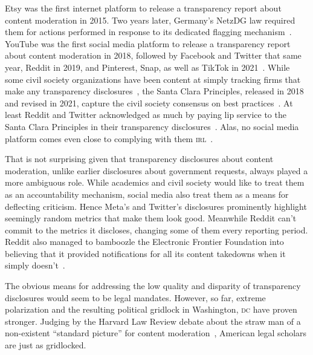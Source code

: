 \documentclass[nonacm,screen]{acmart}
\newcommand\V[1]{\textsc{\MakeLowercase{#1}}}
\begin{document}
Etsy was the first internet platform to release a transparency report about
content moderation in 2015. Two years later, Germany's NetzDG law required them
for actions performed in response to its dedicated flagging
mechanism~\cite{TrustSafetyProfessionalAssociation2022}. YouTube was the first
social media platform to release a transparency report about content moderation
in 2018, followed by Facebook and Twitter that same year, Reddit in 2019, and
Pinterest, Snap, as well as TikTok in 2021~\cite{Binder2018,York2018}. While
some civil society organizations have been content at simply tracking firms that
make any transparency disclosures~\cite{AccessNow2021,StoughtonRosenzweig2022},
the Santa Clara Principles, released in 2018 and revised in 2021, capture the
civil society consensus on best
practices~\cite{AccessNowACLUFoundationOfNorthernCaliforniaea2021}. At least
Reddit and Twitter acknowledged as much by paying lip service to the Santa Clara
Principles in their transparency disclosures~\cite{Reddit2022,Twitter2022}.
Alas, no social media platform comes even close to complying with them
\V{IRL}~\cite{UrmanMakhortykh2023}.

That is not surprising given that transparency disclosures about content
moderation, unlike earlier disclosures about government requests, always played
a more ambiguous role. While academics and civil society would like to treat
them as an accountability mechanism, social media also treat them as a means for
deflecting criticism. Hence Meta's and Twitter's disclosures prominently
highlight seemingly random metrics that make them look good. Meanwhile Reddit
can't commit to the metrics it discloses, changing some of them every reporting
period. Reddit also managed to bamboozle the Electronic Frontier Foundation into
believing that it provided notifications for all its content takedowns when it
simply doesn't~\cite{CrockerGebhartea2019,Hawkins2023}.

The obvious means for addressing the low quality and disparity of transparency
disclosures would seem to be legal mandates. However, so far, extreme
polarization and the resulting political gridlock in Washington, \V{DC} have
proven stronger. Judging by the Harvard Law Review debate about the straw man of
a non-existent ``standard picture'' for content
moderation~\cite{Douek2022,Kadri2022,Klonick2023,MinowMinow2023}, American legal
scholars are just as gridlocked.
\end{document}
